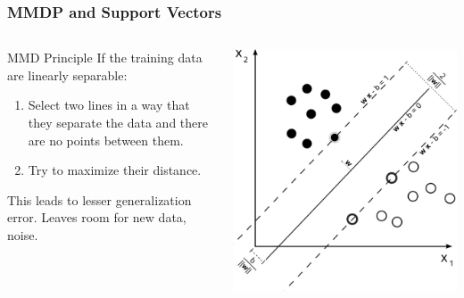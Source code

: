 \documentclass{beamer}
\begin{document}
\begin{frame}
\frametitle{MMDP and Support Vectors}
\begin{columns}[c]


\begin{block}{MMD Principle}
If the training data are linearly separable:
\begin{enumerate}
\item Select two lines in a way that they separate the data and there are no points between them.
\item Try to maximize their distance.
\end{enumerate}
This leads to lesser generalization error. Leaves room for new data, noise.
\end{block}


\includegraphics[scale=.2]{../figures/mm-hyperplane.png}

\end{columns}

\end{frame}

\end{document}
